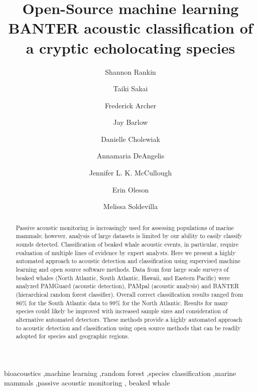 \documentclass[
  authoryear,
  preprint,
  3p]{elsarticle}
\begin{document}
\begin{frontmatter}
\title{Open-Source machine learning BANTER acoustic classification of a
cryptic echolocating species}
\author[1]{Shannon Rankin%
%
}
\author[1]{Taiki Sakai%
%
}
\author[1]{Frederick Archer%
%
}
\author[]{Jay Barlow%
%
}
\author[]{Danielle Cholewiak%
%
}
\author[]{Annamaria DeAngelis%
%
}
\author[]{Jennifer L. K. McCullough%
%
}
\author[]{Erin Oleson%
%
}
\author[]{Melissa Soldevilla%
%
}








        
\begin{abstract}
Passive acoustic monitoring is increasingly used for assessing
populations of marine mammals; however, analysis of large datasets is
limited by our ability to easily classify sounds detected.
Classification of beaked whale acoustic events, in particular, require
evaluation of multiple lines of evidence by expert analysts. Here we
present a highly automated approach to acoustic detection and
classification using supervised machine learning and open source
software methods. Data from four large scale surveys of beaked whales
(North Atlantic, South Atlantic, Hawaii, and Eastern Pacific) were
analyzed PAMGuard (acoustic detection), PAMpal (acoustic analysis) and
BANTER (hierarchical random forest classifier). Overall correct
classification results ranged from 86\% for the South Atlantic data to
99\% for the North Atlantic. Results for many species could likely be
improved with increased sample sizes and consideration of alternative
automated detectors. These methods provide a highly automated approach
to acoustic detection and classification using open source methods that
can be readily adopted for species and geographic regions.
\end{abstract}





\begin{keyword}
    bioacoustics \sep machine learning \sep random forest \sep species
classification \sep marine mammals \sep passive acoustic
monitoring \sep 
    beaked whale
\end{keyword}
\end{frontmatter}
\end{document}
